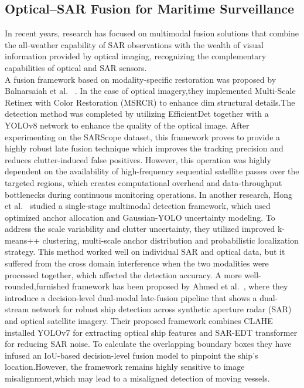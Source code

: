 \subsection{Optical–SAR Fusion for Maritime Surveillance}
In recent years, research has focused on multimodal fusion solutions that combine the all-weather capability of SAR observations with the wealth of visual information provided by optical imaging, recognizing the complementary capabilities of optical and SAR sensors.\\


A fusion framework based on modality-specific restoration was proposed by Balnarsaiah et al. ~\cite{11187945}. In the case of optical imagery,they implemented Multi-Scale Retinex with Color Restoration (MSRCR) to enhance dim structural details.The detection method was completed by utilizing EfficientDet together with a YOLOv8 network to enhance the quality of the optical image. After experimenting on the SARScope dataset, this framework proves to provide a highly robust late fusion technique which improves the tracking precision and reduces clutter-induced false positives. However, this operation was highly dependent on the availability of high-frequency sequential satellite passes over the targeted regions, which creates computational overhead and data-throughput bottlenecks during continuous monitoring operations.
In another research, Hong et al.~\cite{9448440} studied a single-stage multimodal detection framework, which used optimized anchor allocation and Gaussian-YOLO uncertainty modeling. To address the scale variability and clutter uncertainty, they utilized improved k-means++ clustering, multi-scale anchor distribution and probabilistic localization strategy. This method worked well on individual SAR and optical data, but it suffered from the cross domain interference when the two modalities were processed together, which affected the detection accuracy.
A more well-rounded,furnished framework has been proposed by Ahmed et al.~\cite{s25020329}, where they introduce a decision-level dual-modal late-fusion pipeline that shows a dual-stream network for robust ship detection across  synthetic aperture radar (SAR) and optical satellite imagery. Their proposed framework combines CLAHE installed YOLOv7 for extracting optical ship features and SAR-EDT transformer for reducing SAR noise. To calculate the overlapping boundary boxes they have infused an IoU-based decision-level fusion model to pinpoint the ship's location.However, the framework remains highly sensitive to image misalignment,which may lead to a misaligned detection of moving vessels.\\


